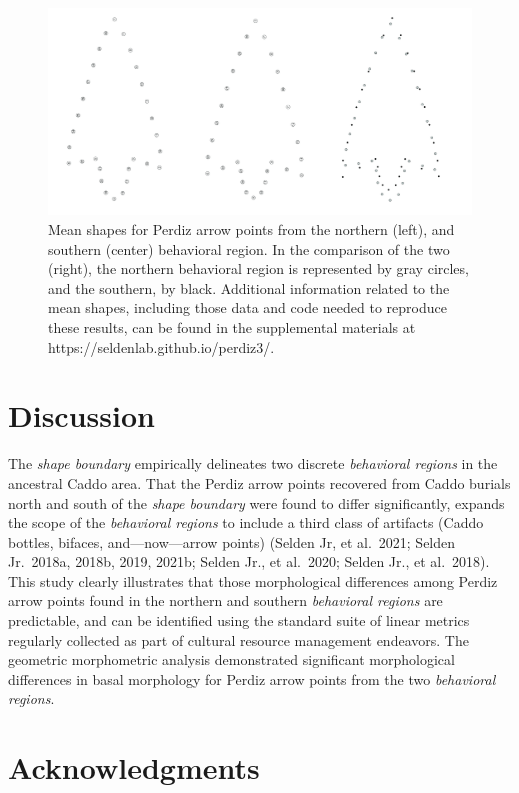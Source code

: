 \documentclass[smallextended]{svjour3}       %
\begin{document}
\begin{figure}
\includegraphics[width=1\linewidth]{ms-figs/figure5} \caption{Mean shapes for Perdiz arrow points from the northern (left), and southern (center) behavioral region. In the comparison of the two (right), the northern behavioral region is represented by gray circles, and the southern, by black. Additional information related to the mean shapes, including those data and code needed to reproduce these results, can be found in the supplemental materials at https://seldenlab.github.io/perdiz3/.}\label{fig:fig5}
\end{figure}

\hypertarget{discussion}{%
\section{Discussion}\label{discussion}}

The \emph{shape boundary} empirically delineates two discrete
\emph{behavioral regions} in the ancestral Caddo area. That the Perdiz
arrow points recovered from Caddo burials north and south of the
\emph{shape boundary} were found to differ significantly, expands the
scope of the \emph{behavioral regions} to include a third class of
artifacts (Caddo bottles, bifaces, and---now---arrow points) (Selden Jr,
et al.~2021; Selden Jr.~2018a, 2018b, 2019, 2021b; Selden Jr., et
al.~2020; Selden Jr., et al.~2018). This study clearly illustrates that
those morphological differences among Perdiz arrow points found in the
northern and southern \emph{behavioral regions} are predictable, and can
be identified using the standard suite of linear metrics regularly
collected as part of cultural resource management endeavors. The
geometric morphometric analysis demonstrated significant morphological
differences in basal morphology for Perdiz arrow points from the two
\emph{behavioral regions}.

\hypertarget{acknowledgments}{%
\section*{Acknowledgments}\label{acknowledgments}}
\end{document}
